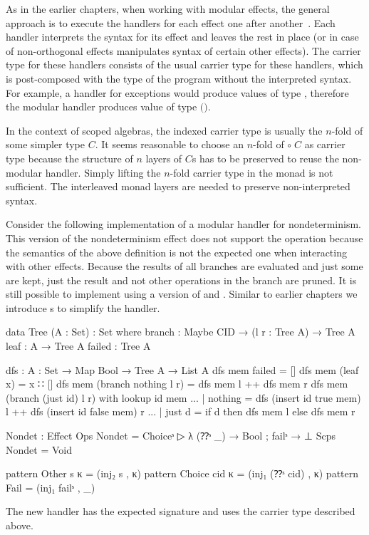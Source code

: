 As in the earlier chapters, when working with modular effects, the general
approach is to execute the handlers for each effect one after
another~\cite{DBLP:conf/haskell/SchrijversPWJ19}.
Each handler interprets the syntax for its effect and leaves the rest in place
(or in case of non-orthogonal effects manipulates syntax of certain other
effects).
The carrier type for these handlers consists of the usual carrier type for these
handlers, which is post-composed with the type of the program without the
interpreted syntax.
For example, a handler for exceptions would produce values of type
\AgdaSpace{}\AgdaSpace{},
therefore the modular handler produces value of type 
\AgdaSpace{}\AgdaSpace{}$($\AgdaSpace{}\AgdaSpace{}$)$.

In the context of scoped algebras, the  indexed carrier type is
usually the $n$-fold of some simpler type $C$.
It seems reasonable to choose an $n$-fold of
\AgdaSpace{}\AgdaSpace{}$\circ\; C$ as
carrier type because the structure of $n$ layers of $C$s has to be preserved to
reuse the non-modular handler.
Simply lifting the $n$-fold carrier type in the monad is not sufficient.
The interleaved monad layers are needed to preserve non-interpreted syntax.

Consider the following implementation of a modular handler for nondeterminism.
This version of the nondeterminism effect does not support the
 operation because the semantics of the above definition is
not the expected one when interacting with other effects.
Because the results of all branches are evaluated and just some are kept, just
the result and not other operations in the branch are pruned.
It is still possible to implement  using a version of
 and .
Similar to earlier chapters we introduce s to simplify
the handler.

\begin{code}[hide]
data Tree (A : Set) : Set where
  branch : Maybe CID → (l r : Tree A) → Tree A
  leaf   : A → Tree A
  failed : Tree A

dfs : {A : Set} → Map Bool → Tree A → List A
dfs mem failed                   = []
dfs mem (leaf x)                 = x ∷ []
dfs mem (branch nothing    l r)  = dfs mem l ++ dfs mem r
dfs mem (branch (just id)  l r) with lookup id mem
... | nothing  = dfs (insert id true mem) l ++ dfs (insert id false mem) r
... | just d   = if d then dfs mem l else dfs mem r
\end{code}
\begin{code}
Nondet : Effect
Ops   Nondet = Choiceˢ ▷ λ{ (⁇ˢ _) → Bool ; failˢ → ⊥ }
Scps  Nondet = Void

pattern Other s κ     = (inj₂ s , κ)
pattern Choice cid κ  = (inj₁ (⁇ˢ cid) , κ)
pattern Fail          = (inj₁ failˢ , _)
\end{code}
The new handler has the expected signature and uses the carrier type described
above.

